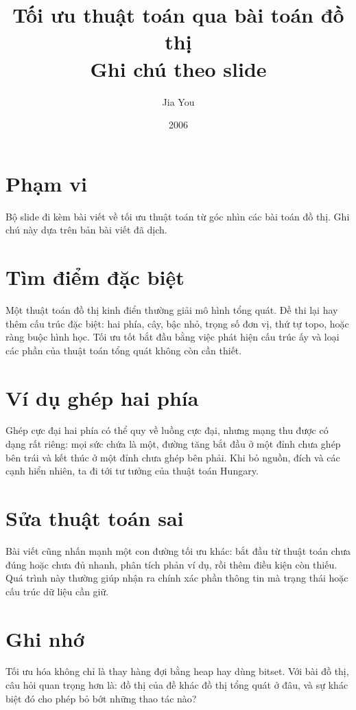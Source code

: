 \documentclass[11pt]{article}
\title{Tối ưu thuật toán qua bài toán đồ thị\\{\large Ghi chú theo slide}}
\author{Jia You}
\date{2006}
\begin{document}
\maketitle


\section{Phạm vi}

Bộ slide đi kèm bài viết về tối ưu thuật toán từ góc nhìn các bài toán đồ
thị. Ghi chú này dựa trên bản bài viết đã dịch.

\section{Tìm điểm đặc biệt}

Một thuật toán đồ thị kinh điển thường giải mô hình tổng quát. Đề thi lại hay
thêm cấu trúc đặc biệt: hai phía, cây, bậc nhỏ, trọng số đơn vị, thứ tự topo,
hoặc ràng buộc hình học. Tối ưu tốt bắt đầu bằng việc phát hiện cấu trúc ấy và
loại các phần của thuật toán tổng quát không còn cần thiết.

\section{Ví dụ ghép hai phía}

Ghép cực đại hai phía có thể quy về luồng cực đại, nhưng mạng thu được có
dạng rất riêng: mọi sức chứa là một, đường tăng bắt đầu ở một đỉnh chưa ghép
bên trái và kết thúc ở một đỉnh chưa ghép bên phải. Khi bỏ nguồn, đích và các
cạnh hiển nhiên, ta đi tới tư tưởng của thuật toán Hungary.

\section{Sửa thuật toán sai}

Bài viết cũng nhấn mạnh một con đường tối ưu khác: bắt đầu từ thuật toán chưa
đúng hoặc chưa đủ nhanh, phân tích phản ví dụ, rồi thêm điều kiện còn thiếu.
Quá trình này thường giúp nhận ra chính xác phần thông tin mà trạng thái hoặc
cấu trúc dữ liệu cần giữ.

\section{Ghi nhớ}

Tối ưu hóa không chỉ là thay hàng đợi bằng heap hay dùng bitset. Với bài đồ
thị, câu hỏi quan trọng hơn là: đồ thị của đề khác đồ thị tổng quát ở đâu, và
sự khác biệt đó cho phép bỏ bớt những thao tác nào?
\end{document}
